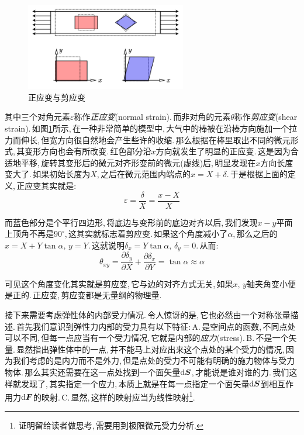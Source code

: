 \begin{figure}
\vspace{-0.5cm}
\centering
\includegraphics[width=7cm]{image/6-7-1.png}
\caption{正应变与剪应变}\label{6-7-1}
\end{figure}
其中三个对角元素$\varepsilon$称作\emph{正应变}(normal strain).\,而非对角的元素$\theta$称作\emph{剪应变}(shear strain).\,如图\ref{6-7-1}所示,\,在一种非常简单的模型中,\,大气中的棒被在沿棒方向施加一个拉力而伸长,\,但宽方向很自然地会产生些许的收缩.\,那么根据在棒里取出不同的微元形式,\,其变形方向也会有所改变.\,红色部分沿$x$方向就发生了明显的正应变.\,这是因为合适地平移,\,旋转其变形后的微元对齐形变前的微元(虚线)后,\,明显发现在$x$方向长度变大了.\,如果初始长度为$X$,\,之后在微元范围内端点的$x=X+\delta$.\,于是根据上面的定义,\,正应变其实就是:
\[\varepsilon=\frac{\delta}{X}=\frac{x-X}{X}\]

而蓝色部分是个平行四边形,\,将底边与变形前的底边对齐以后,\,我们发现$x-y$平面上顶角不再是$90^\circ$,\,这其实就标志着剪应变.\,如果这个角度减小了$\alpha$,\,那么之后的$x=X+Y\tan\alpha,\,y=Y$.\,这就说明$\delta_x=Y\tan\alpha,\,\delta_y=0$.\,从而:
\[\theta_{xy}=\frac{\partial \delta_y}{\partial X}+\frac{\partial \delta_x}{\partial Y}=\tan\alpha\approx \alpha\]

可见这个角度变化其实就是剪应变,\,它与边的对齐方式无关,\,如果$x,\,y$轴夹角变小便是正的.\,正应变,\,剪应变都是无量纲的物理量.

\vspace{0.5cm}

接下来需要考虑弹性体的内部受力情况.\,令人惊讶的是,\,它也必然由一个对称张量描述.\,首先我们意识到弹性力内部的受力具有以下特征:\,A.\,是空间点的函数,\,不同点处可以不同,\,但每一点应当有一个受力情况,\,它就是内部的\emph{应力}(stress).\,B.\,不是一个矢量.\,显然指出弹性体中的一点,\,并不能马上对应出来这个点处的某个受力的情况,\,因为我们考虑的是内力而不是外力,\,但是点处的受力不可能有明确的施力物体与受力物体.\,那么其实还需要在这一点处找到一个面矢量$\textrm{d} \boldsymbol{S}$,\,才能说是谁对谁的力.\,我们这样就发现了,\,其实指定一个应力,\,本质上就是在每一点指定一个面矢量$\textrm{d} \boldsymbol{S}$到相互作用力$\textrm{d} \boldsymbol{F}$的映射.\,C.\,显然,\,这样的映射应当为线性映射\footnote{证明留给读者做思考,\,需要用到极限微元受力分析.}.

